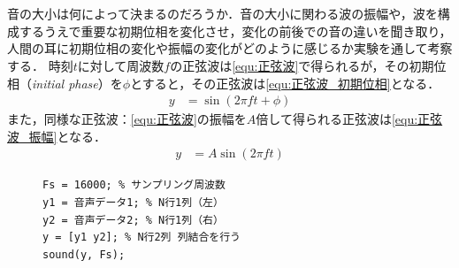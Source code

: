 \section{\kadaiab}\label{sec:\kadaiab}
\purpose
音の大小は何によって決まるのだろうか．音の大小に関わる波の振幅や，波を構成するうえで重要な初期位相を変化させ，変化の前後での音の違いを聞き取り，人間の耳に初期位相の変化や振幅の変化がどのように感じるか実験を通して考察する．
\method
時刻\(t\)に対して周波数\(f\)の正弦波は\eqref{equ:正弦波}で得られるが，その初期位相（\textit{initial phase}）を\(\phi\)とすると，その正弦波は\eqref{equ:正弦波_初期位相}となる．
\begin{align}
    y & =\sin(2\pi ft+\phi)\label{equ:正弦波_初期位相}
\end{align}また，同様な正弦波：\eqref{equ:正弦波}の振幅を\(A\)倍して得られる正弦波は\eqref{equ:正弦波_振幅}となる．
\begin{align}
    y & =A\sin(2\pi ft)\label{equ:正弦波_振幅}
\end{align}
\begin{figure}
    \begin{lstlisting}[caption={左右から別の音を出力},label={src:左右から別の音を出力},numbers={none}]
Fs = 16000; % サンプリング周波数
y1 = 音声データ1; % N行1列（左）
y2 = 音声データ2; % N行1列（右）
y = [y1 y2]; % N行2列 列結合を行う
sound(y, Fs); 
    \end{lstlisting}
    \vspace{-1cm}
\end{figure}
